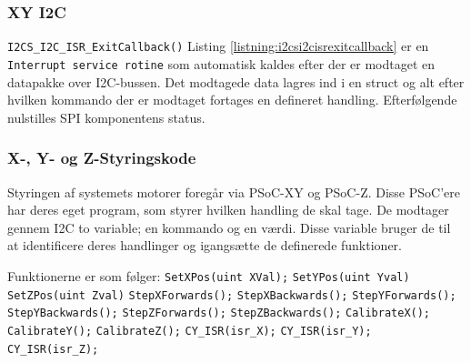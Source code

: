 \subsubsection{XY I2C}



\verb+I2CS_I2C_ISR_ExitCallback()+ Listing \ref{listning:i2csi2cisrexitcallback} er en \verb+Interrupt service rotine+ som automatisk kaldes efter der er modtaget en datapakke over I2C-bussen.
Det modtagede data lagres ind i en struct og alt efter hvilken kommando der er modtaget fortages en defineret handling. Efterfølgende nulstilles SPI komponentens status.

\subsubsection{X-, Y- og Z-Styringskode}

Styringen af systemets motorer foregår via PSoC-XY og PSoC-Z. Disse PSoC'ere har deres eget program, som styrer hvilken handling de skal tage. De modtager gennem I2C to variable; en kommando og en værdi. Disse variable bruger de til at identificere deres handlinger og igangsætte de definerede funktioner.  


Funktionerne er som følger: \newline
\verb+SetXPos(uint XVal);+  \newline
\verb+SetYPos(uint Yval)+   \newline
\verb+SetZPos(uint Zval)+   \newline
\verb+StepXForwards();+     \newline
\verb+StepXBackwards();+    \newline
\verb+StepYForwards();+     \newline
\verb+StepYBackwards();+    \newline
\verb+StepZForwards();+     \newline
\verb+StepZBackwards();+    \newline
\verb+CalibrateX();+        \newline
\verb+CalibrateY();+        \newline
\verb+CalibrateZ();+        \newline
\verb+CY_ISR(isr_X);+	    \newline
\verb+CY_ISR(isr_Y);+	    \newline
\verb+CY_ISR(isr_Z);+	    \newline



